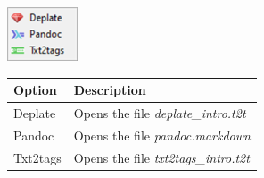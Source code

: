 \includegraphics[scale=0.50]{./res/menu_help_conversion.png}\\

\begin{scriptsize}
  \begin{tabularx}{\textwidth}{>{\hsize=0.3\hsize}X>{\hsize=0.7\hsize}X}\\
    \hline
    \textbf{Option} & \textbf{Description} \\
    \hline
    Deplate & Opens the file \textit{deplate\_intro.t2t} \\
    Pandoc & Opens the file \textit{pandoc.markdown} \\
    Txt2tags & Opens the file \textit{txt2tags\_intro.t2t} \\
    \hline
  \end{tabularx}
\end{scriptsize}
